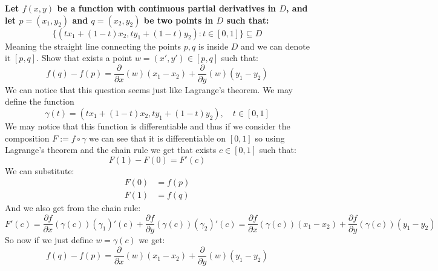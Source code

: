 \documentclass{article}
\theoremstyle{plain}
\begin{document}
	\textbf{Let $f(x,y)$ be a function with continuous partial derivatives
	in $D$, and let $p=(x_1,y_2)$ and $q=(x_2,y_2)$ be two points in $D$
	such that:
	\[
		\{(tx_1+(1-t)x_2, ty_1+(1-t)y_2) \colon t\in[0,1]\} \subseteq D
	\]}
	Meaning the straight line connecting the points $p,q$ is inside $D$
	and we can denote it $[p,q]$. Show that exists a point $w=(x',y')\in[p,q]$
	such that:
	\[
		f(q) - f(p) = 
		\frac{\partial}{\partial x}(w)(x_1-x_2) +
		\frac{\partial}{\partial y}(w)(y_1-y_2)
	\]
	We can notice that this question seems just like Lagrange's theorem.
	We may define the function 
	\[
		\gamma(t) = (tx_1+(1-t)x_2, ty_1+(1-t)y_2), \quad t\in[0,1]
	\]
	We may notice that this function is differentiable and thus if we consider
	the composition $F := f\circ\gamma$ we can see that it is differentiable
	on $[0,1]$ so using Lagrange's theorem and the chain rule we get that
	exists $c\in[0,1]$ such that:
	\[
		F(1) - F(0) = F'(c)
	\]
	We can substitute:
	\begin{align*}
		F(0) &= f(p) \\
		F(1) &= f(q)
	\end{align*}
	And we also get from the chain rule:
	\[
		F'(c) =
		\frac{\partial f}{\partial x}(\gamma(c))(\gamma_1)'(c) + 
		\frac{\partial f}{\partial y}(\gamma(c))(\gamma_2)'(c) = 
		\frac{\partial f}{\partial x}(\gamma(c))(x_1-x_2) + 
		\frac{\partial f}{\partial y}(\gamma(c))(y_1-y_2)
	\]
	So now if we just define $w = \gamma(c)$ we get:
	\[
		f(q) - f(p) = 
		\frac{\partial}{\partial x}(w)(x_1-x_2) +
		\frac{\partial}{\partial y}(w)(y_1-y_2)
	\]
	
	\newpage
	
\end{document}
